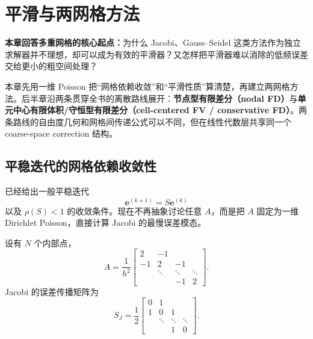\chapter{平滑与两网格方法}
\label{ch:two-grid}

\begin{keybox}
\textbf{本章回答多重网格的核心起点：}为什么 Jacobi、Gauss--Seidel 这类方法作为独立求解器并不理想，却可以成为有效的平滑器？又怎样把平滑器难以消除的低频误差交给更小的粗空间处理？

本章先用一维 Poisson 把“网格依赖收敛”和“平滑性质”算清楚，再建立两网格方法。后半章沿两条贯穿全书的离散路线展开：\textbf{节点型有限差分（nodal FD）}与\textbf{单元中心有限体积/守恒型有限差分（cell-centered FV / conservative FD）}。两条路线的自由度几何和网格间传递公式可以不同，但在线性代数层共享同一个 coarse-space correction 结构。
\end{keybox}

\section{平稳迭代的网格依赖收敛性}
\label{sec:smoother-grid-dependence}

已经给出一般平稳迭代
\begin{equation}
\bm e^{(k+1)}=S\bm e^{(k)}
\end{equation}
以及 $\rho(S)<1$ 的收敛条件。现在不再抽象讨论任意 $A$，而是把 $A$ 固定为一维 Dirichlet Poisson，直接计算 Jacobi 的最慢误差模态。

设有 $N$ 个内部点，
\begin{equation}
A
=
\frac1{h^2}
\begin{bmatrix}
2&-1&&\\
-1&2&-1&\\
&\ddots&\ddots&\ddots\\
&&-1&2
\end{bmatrix}.
\end{equation}
Jacobi 的误差传播矩阵为
\begin{equation}
S_J
=
\frac12
\begin{bmatrix}
0&1&&\\
1&0&1&\\
&\ddots&\ddots&\ddots\\
&&1&0
\end{bmatrix}.
\label{eq:smoothing-jacobi-error-matrix}
\end{equation}

